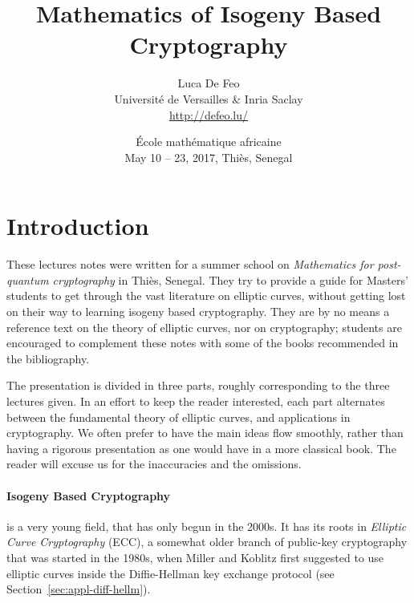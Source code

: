 \documentclass[10pt]{article}
\title{Mathematics of Isogeny Based Cryptography}
\author{Luca De Feo\\
  Universit\'e de Versailles \& Inria Saclay\\
  \url{http://defeo.lu/}}
\date{\'Ecole math\'ematique africaine\\
  May 10 -- 23, 2017, Thi\`es, Senegal}
\theoremstyle{plain}
\theoremstyle{definition}
\begin{document}
\maketitle
\thispagestyle{fancy}
\renewcommand{\headrulewidth}{0pt}
\renewcommand{\footrulewidth}{0.4pt}
\cfoot{\doclicenseThis}

\section*{Introduction}

These lectures notes were written for a summer school on
\emph{Mathematics for post-quantum cryptography} in Thiès, Senegal. %
They try to provide a guide for Masters' students to get through the
vast literature on elliptic curves, without getting lost on their way
to learning isogeny based cryptography. %
They are by no means a reference text on the theory of elliptic
curves, nor on cryptography; students are encouraged to complement
these notes with some of the books recommended in the bibliography. %

The presentation is divided in three parts, roughly corresponding to
the three lectures given. %
In an effort to keep the reader interested, each part alternates
between the fundamental theory of elliptic curves, and applications in
cryptography. %
We often prefer to have the main ideas flow smoothly, rather than
having a rigorous presentation as one would have in a more classical
book. %
The reader will excuse us for the inaccuracies and the omissions.

\paragraph{Isogeny Based Cryptography} is a very young field, that has
only begun in the 2000s. %
It has its roots in \emph{Elliptic Curve Cryptography} (ECC), a
somewhat older branch of public-key cryptography that was started in
the 1980s, when Miller and Koblitz first suggested to use elliptic
curves inside the Diffie-Hellman key exchange protocol (see
Section~\ref{sec:appl-diff-hellm}). %
\end{document}
